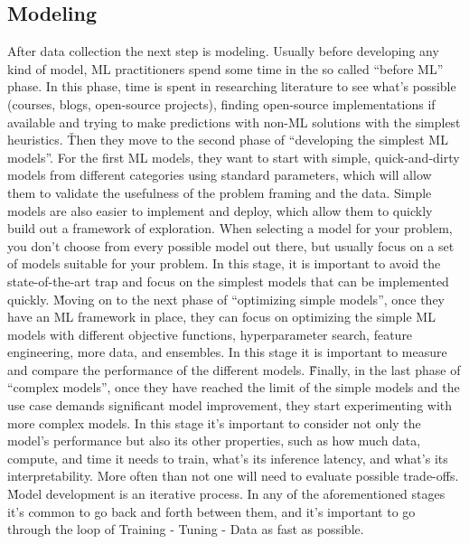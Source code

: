 \subsection{Modeling}

After data collection the next step is modeling. Usually before developing any kind of model, ML practitioners spend
some time in the so called ``before ML'' phase. In this phase, time is spent in researching literature to see what's
possible (courses, blogs, open-source projects), finding open-source implementations if available and trying to make
predictions with non-ML solutions with the simplest heuristics. \v

Then they move to the second phase of ``developing the simplest ML models''. For the first ML models, they want to
start with simple, quick-and-dirty models from different categories using standard parameters, which will allow them
to validate the usefulness of the problem framing and the data. Simple models are also easier to implement and deploy,
which allow them to quickly build out a framework of exploration. When selecting a model for your problem, you don't
choose from every possible model out there, but usually focus on a set of models suitable for your problem. In this
stage, it is important to avoid the state-of-the-art trap and focus on the simplest models that can be implemented
quickly. \v

Moving on to the next phase of ``optimizing simple models'', once they have an ML framework in place, they can focus
on optimizing the simple ML models with different objective functions, hyperparameter search, feature engineering,
more data, and ensembles. In this stage it is important to measure and compare the performance of the different models.
\v

Finally, in the last phase of ``complex models'', once they have reached the limit of the simple models and the use
case demands significant model improvement, they start experimenting with more complex models. In this stage it's
important to consider not only the model's performance but also its other properties, such as how much data, compute,
and time it needs to train, what's its inference latency, and what's its interpretability. More often than not one
will need to evaluate possible trade-offs. \v

Model development is an iterative process. In any of the aforementioned stages it's common to go back and forth
between them, and it's important to go through the loop of Training - Tuning - Data as fast as possible.

